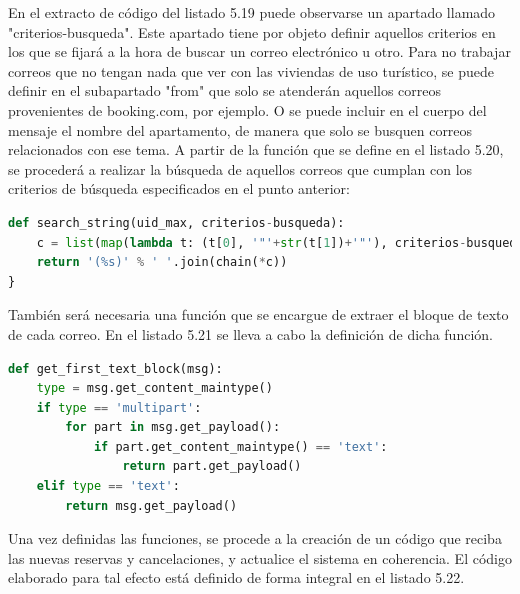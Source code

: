 En el extracto de código del listado 5.19 puede observarse un apartado llamado "criterios-busqueda". Este apartado tiene por objeto definir aquellos criterios en los que se fijará a la hora de buscar un correo electrónico u otro. Para no trabajar correos que no tengan nada que ver con las viviendas de uso turístico, se puede definir en el subapartado "from" que solo se atenderán aquellos correos provenientes de booking.com, por ejemplo. O se puede incluir en el cuerpo del mensaje el nombre del apartamento, de manera que solo se busquen correos relacionados con ese tema.
A partir de la función que se define en el listado 5.20, se procederá a realizar la búsqueda de aquellos correos que cumplan con los criterios de búsqueda especificados en el punto anterior:
\begin{lstlisting}[language=Python,
    caption={Búsqueda de correos de reservas o cancelaciones},
    label=src:busqueda-de-correos
]
def search_string(uid_max, criterios-busqueda):
    c = list(map(lambda t: (t[0], '"'+str(t[1])+'"'), criterios-busqueda.items())) + [('UID', '%d:*' % (uid_max+1))]
    return '(%s)' % ' '.join(chain(*c))
}
\end{lstlisting}
También será necesaria una función que se encargue de extraer el bloque de texto de cada correo. En el listado 5.21 se lleva a cabo la definición de dicha función.
\begin{lstlisting}[language=Python,
    caption={Extracción de texto del correo},
    label=src:extraccion-del-texto-del-correo
]
def get_first_text_block(msg):
    type = msg.get_content_maintype()
    if type == 'multipart':
        for part in msg.get_payload():
            if part.get_content_maintype() == 'text':
                return part.get_payload()
    elif type == 'text':
        return msg.get_payload()
\end{lstlisting}
Una vez definidas las funciones, se procede a la creación de un código que reciba las nuevas reservas y cancelaciones, y actualice el sistema en coherencia. El código elaborado para tal efecto está definido de forma integral en el listado 5.22.
